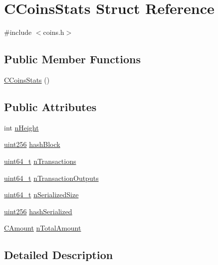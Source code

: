 \hypertarget{struct_c_coins_stats}{}\section{C\+Coins\+Stats Struct Reference}
\label{struct_c_coins_stats}


{\ttfamily \#include $<$coins.\+h$>$}

\subsection*{Public Member Functions}
\begin{DoxyCompactItemize}
\item 
\hyperlink{struct_c_coins_stats_a3f68ce1f423e40599c8d3c4bf2d97aa9}{C\+Coins\+Stats} ()
\end{DoxyCompactItemize}
\subsection*{Public Attributes}
\begin{DoxyCompactItemize}
\item 
int \hyperlink{struct_c_coins_stats_a5972700c4733ce02e12530d758e95d8c}{n\+Height}
\item 
\hyperlink{classuint256}{uint256} \hyperlink{struct_c_coins_stats_a75b32757ea85b8df6453490e1acc4607}{hash\+Block}
\item 
\hyperlink{stdint_8h_aaa5d1cd013383c889537491c3cfd9aad}{uint64\+\_\+t} \hyperlink{struct_c_coins_stats_a0b04da159443c350e9b9e8a39c6a82db}{n\+Transactions}
\item 
\hyperlink{stdint_8h_aaa5d1cd013383c889537491c3cfd9aad}{uint64\+\_\+t} \hyperlink{struct_c_coins_stats_a02612be210ba7c628d04ddedd83b9ff0}{n\+Transaction\+Outputs}
\item 
\hyperlink{stdint_8h_aaa5d1cd013383c889537491c3cfd9aad}{uint64\+\_\+t} \hyperlink{struct_c_coins_stats_ac4302ffc2f8be6e62dbc5655f77e4202}{n\+Serialized\+Size}
\item 
\hyperlink{classuint256}{uint256} \hyperlink{struct_c_coins_stats_a0ce8e745d7a62e4ae41f943333c81d7c}{hash\+Serialized}
\item 
\hyperlink{amount_8h_a4eaf3a5239714d8c45b851527f7cb564}{C\+Amount} \hyperlink{struct_c_coins_stats_a97c76344c650e55377d5f9246a906cc4}{n\+Total\+Amount}
\end{DoxyCompactItemize}


\subsection{Detailed Description}


